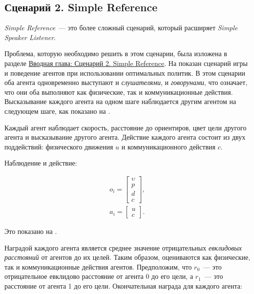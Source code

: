 \subsection{Сценарий 2. Simple Reference} \label{exp-sr}

\textit{Simple Reference}~--- это более сложный сценарий, который расширяет \textit{Simple Speaker Listener}.

Проблема, которую необходимо решить в этом сценарии, была изложена в разделе \hyperref[intro-sr]{Вводная глава: Сценарий 2. Simple Reference}. На  показан сценарий игры и поведение агентов при использовании оптимальных политик. В этом сценарии оба агента одновременно выступают и \textit{слушателями}, и \textit{говорунами}, что означает, что они оба выполняют как физические, так и коммуникационные действия. Высказывание каждого агента на одном шаге наблюдается другим агентом на следующем шаге, как показано на .

Каждый агент наблюдает скорость, расстояние до ориентиров, цвет цели другого агента и высказывание другого агента. Действие каждого агента состоит из двух поддействий: физического движения $u$ и коммуникационного действия $c$.

Наблюдение и действие:

\begin{equation}
    \begin{multlined}
        o_i = \begin{bmatrix}
                  \upsilon \\ p \\ d \\ c
        \end{bmatrix}, \\
        a_i = \begin{bmatrix}
                  u \\ c
        \end{bmatrix}.
    \end{multlined}
\end{equation}


Это показано на .

Наградой каждого агента является среднее значение отрицательных \textit{евклидовых расстояний} от агентов до их целей. Таким образом, оцениваются как физические, так и коммуникационные действия агентов. Предположим, что $r_0$~--- это отрицательное евклидово расстояние от агента 0 до его цели, а $r_1$~--- это расстояние от агента 1 до его цели. Окончательная награда для каждого агента:

